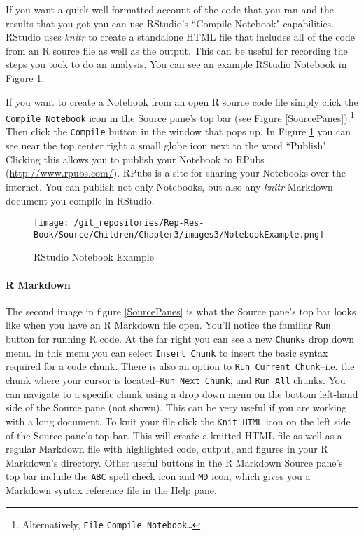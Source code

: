{{If you want a quick well formatted account of the code that you ran and the results that you got you can use RStudio's ``Compile Notebook" capabilities. RStudio uses {\emph{knitr}} to create a standalone HTML file that includes all of the code from an R source file as well as the output. This can be useful for recording the steps you took to do an analysis. You can see an example RStudio Notebook in Figure \ref{NotebookExample}. 

If you want to create a Notebook from an open R source code file simply click the \texttt{Compile Notebook} icon in the Source pane's top bar (see Figure \ref{SourcePanes}).\footnote{Alternatively, \texttt{File} \textrightarrow \; \texttt{Compile Notebook\ldots}} Then click the \texttt{Compile} button in the window that pops up. In Figure \ref{NotebookExample} you can see near the top center right a small globe icon next to the word ``Publish". Clicking this allows you to publish your Notebook to RPubs (\url{http://www.rpubs.com/}). RPubs is a site for sharing your Notebooks over the internet. You can publish not only Notebooks, but also any {\emph{knitr}} Markdown document you compile in RStudio.

\begin{figure}
    \caption{RStudio Notebook Example}
    \label{NotebookExample}
    \begin{center}
    
\texttt{[image: /git\_repositories/Rep-Res-Book/Source/Children/Chapter3/images3/NotebookExample.png]}
    \end{center}
\end{figure}

\paragraph{R Markdown} The second image in figure \ref{SourcePanes} is what the Source pane's top bar looks like when you have an R Markdown file open. You'll notice the familiar \texttt{Run} button for running R code. At the far right you can see a new \texttt{Chunks} drop down menu. In this menu you can select \texttt{Insert Chunk} to insert the basic syntax required for a code chunk. There is also an option to \texttt{Run Current Chunk}--i.e. the chunk where your cursor is located--\texttt{Run Next Chunk}, and \texttt{Run All} chunks. You can navigate to a specific chunk using a drop down menu on the bottom left-hand side of the Source pane (not shown). This can be very useful if you are working with a long document. To knit your file click the \texttt{Knit HTML} icon on the left side of the Source pane's top bar. This will create a knitted HTML file as well as a regular Markdown file with highlighted code, output, and figures in your R Markdown's directory. Other useful buttons in the R Markdown Source pane's top bar include the \texttt{ABC} spell check icon and \texttt{MD} icon, which gives you a Markdown syntax reference file in the Help pane.

}}
